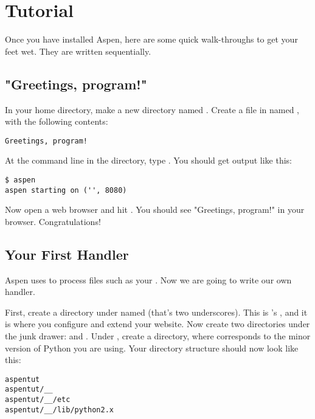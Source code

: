 \chapter{Tutorial \label{tutorial}}

Once you have installed Aspen, here are some quick walk-throughs to get your
feet wet. They are written sequentially.


\section{"Greetings, program!" \label{tutorial-greetings-program}}

In your home directory, make a new directory named . Create a
file in  named , with the following contents:

\begin{verbatim}
Greetings, program!
\end{verbatim}

At the command line in the  directory, type . You
should get output like this:

\begin{verbatim}
$ aspen
aspen starting on ('', 8080)
\end{verbatim}

Now open a web browser and hit . You should see
"Greetings, program!" in your browser. Congratulations!


\section{Your First Handler \label{tutorial-handler}}

Aspen uses  to process files such as your . Now
we are going to write our own handler.

First, create a directory under  named \file{__} (that's two
underscores). This is 's , and it is where
you configure and extend your website. Now create two directories under the
junk drawer:  and . Under , create a
 directory, where  corresponds to the minor version of
Python you are using. Your directory structure should now look like this:

\begin{verbatim}
aspentut
aspentut/__
aspentut/__/etc
aspentut/__/lib/python2.x
\end{verbatim}

